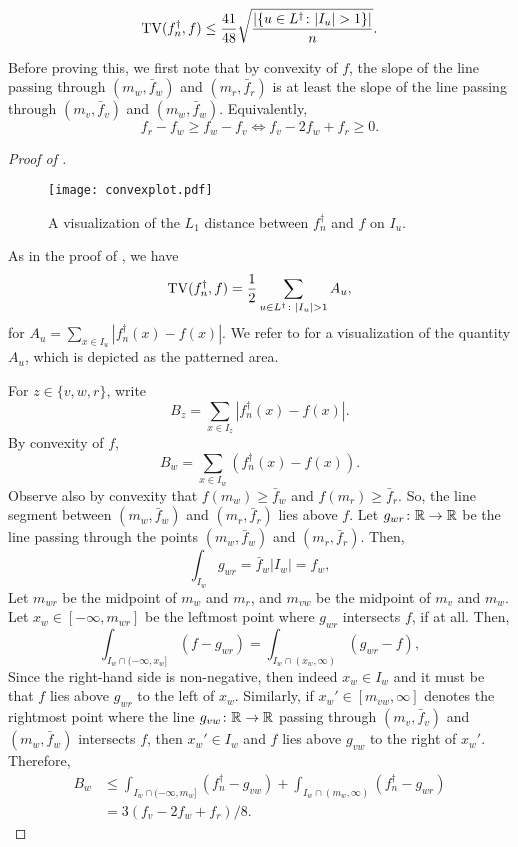 \begin{prop}
  \[
    \operatorname{TV}(f_n^\dagger, f) \le \frac{41}{48} \sqrt{\frac{|\{u \in L^\dagger \colon |I_u| > 1\}|}{n} } .
  \]
\end{prop}
Before proving this, we first note that by convexity of $f$, the slope
of the line passing through $(m_w, \bar{f}_w)$ and $(m_r, \bar{f}_r)$
is at least the slope of the line passing through $(m_v, \bar{f}_v)$
and $(m_w, \bar{f}_w)$. Equivalently,
\[
  f_r - f_w \ge f_w - f_v \iff f_v - 2 f_w + f_r \ge 0 .
\]
\begin{proof}[Proof of ]
  \begin{figure} 
    \centering
    \texttt{[image: convexplot.pdf]}
    \caption{A visualization of the $L_1$ distance between $f^\dagger_n$ and
      $f$ on $I_u$.}
  \end{figure}  
  As in the proof of , we have
  \[
    \operatorname{TV}(f_n^\dagger, f) = \frac{1}{2} \sum_{u \in L^\dagger \colon |I_u| > 1} A_u ,
  \]
  for $A_u = \sum_{x \in I_u} |f_n^\dagger(x) - f(x)|$. We refer to
   for a visualization of the quantity $A_u$, which
  is depicted as the patterned area.


  For $z \in \{v, w, r\}$, write
  \[
    B_z = \sum_{x \in I_z} |f^\dagger_n(x) - f(x)| .
  \]
  By convexity of $f$,
  \[
    B_w = \sum_{x \in I_w} (f^\dagger_n(x) - f(x)) .
  \]
  Observe also by convexity that $f(m_w) \ge \bar{f}_w$ and
  $f(m_r) \ge \bar{f}_r$. So, the line segment between
  $(m_w, \bar{f}_w)$ and $(m_r, \bar{f}_r)$ lies above $f$. Let
  $g_{wr} \colon \mathbb{R} \to \mathbb{R}$ be the line passing through the points
  $(m_w, \bar{f}_w)$ and $(m_r, \bar{f}_r)$. Then,
  \[
    \int_{I_w} g_{wr} = \bar{f}_w |I_w| = f_w ,
  \]
  Let $m_{wr}$ be the midpoint of $m_w$ and $m_r$, and $m_{vw}$ be the
  midpoint of $m_v$ and $m_w$. Let $x_w \in [-\infty, m_{wr}]$ be the
  leftmost point where $g_{wr}$ intersects $f$, if at all. Then,
  \[
    \int_{I_w \cap (-\infty, x_w]} (f - g_{wr}) = \int_{I_w \cap (x_w, \infty)} (g_{wr} - f),
  \]
  Since the right-hand side is non-negative, then indeed $x_w \in I_w$
  and it must be that $f$ lies above $g_{wr}$ to the left of
  $x_w$. Similarly, if $x_w' \in [m_{vw}, \infty]$ denotes the
  rightmost point where the line $g_{vw} \colon \mathbb{R} \to \mathbb{R}$ passing
  through $(m_v, \bar{f}_v)$ and $(m_w, \bar{f}_w)$ intersects $f$,
  then $x_w' \in I_w$ and $f$ lies above $g_{vw}$ to the right of
  $x_w'$. Therefore,
  \begin{align*}
    B_w &\le \int_{I_w \cap (-\infty, m_w]} (f^\dagger_n - g_{vw}) + \int_{I_w \cap (m_w, \infty)} (f^\dagger_n - g_{wr}) \\
        &= 3(f_v - 2 f_w + f_r)/8 .
  \end{align*}


\end{proof}
